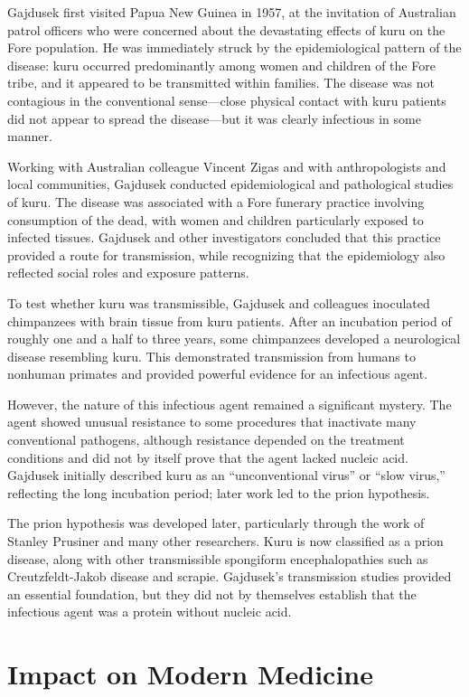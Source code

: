 Gajdusek first visited Papua New Guinea in 1957, at the invitation of Australian patrol officers who were concerned about the devastating effects of kuru on the Fore population. He was immediately struck by the epidemiological pattern of the disease: kuru occurred predominantly among women and children of the Fore tribe, and it appeared to be transmitted within families. The disease was not contagious in the conventional sense---close physical contact with kuru patients did not appear to spread the disease---but it was clearly infectious in some manner.

Working with Australian colleague Vincent Zigas and with anthropologists and local communities, Gajdusek conducted epidemiological and pathological studies of kuru. The disease was associated with a Fore funerary practice involving consumption of the dead, with women and children particularly exposed to infected tissues. Gajdusek and other investigators concluded that this practice provided a route for transmission, while recognizing that the epidemiology also reflected social roles and exposure patterns.

To test whether kuru was transmissible, Gajdusek and colleagues inoculated chimpanzees with brain tissue from kuru patients. After an incubation period of roughly one and a half to three years, some chimpanzees developed a neurological disease resembling kuru. This demonstrated transmission from humans to nonhuman primates and provided powerful evidence for an infectious agent.

However, the nature of this infectious agent remained a significant mystery. The agent showed unusual resistance to some procedures that inactivate many conventional pathogens, although resistance depended on the treatment conditions and did not by itself prove that the agent lacked nucleic acid. Gajdusek initially described kuru as an ``unconventional virus'' or ``slow virus,'' reflecting the long incubation period; later work led to the prion hypothesis.

The prion hypothesis was developed later, particularly through the work of Stanley Prusiner and many other researchers. Kuru is now classified as a prion disease, along with other transmissible spongiform encephalopathies such as Creutzfeldt-Jakob disease and scrapie. Gajdusek's transmission studies provided an essential foundation, but they did not by themselves establish that the infectious agent was a protein without nucleic acid.

\section{Impact on Modern Medicine}

